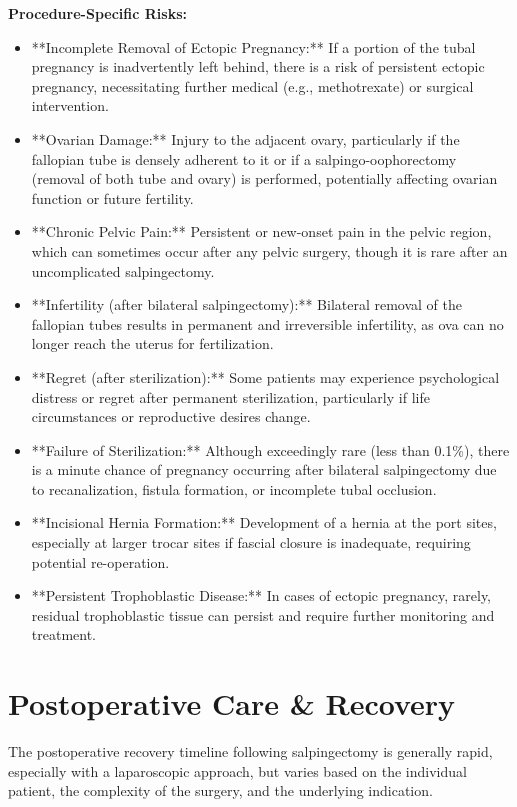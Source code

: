 \textbf{Procedure-Specific Risks:}
\begin{itemize}
  \item **Incomplete Removal of Ectopic Pregnancy:** If a portion of the tubal pregnancy is inadvertently left behind, there is a risk of persistent ectopic pregnancy, necessitating further medical (e.g., methotrexate) or surgical intervention.
  \item **Ovarian Damage:** Injury to the adjacent ovary, particularly if the fallopian tube is densely adherent to it or if a salpingo-oophorectomy (removal of both tube and ovary) is performed, potentially affecting ovarian function or future fertility.
  \item **Chronic Pelvic Pain:** Persistent or new-onset pain in the pelvic region, which can sometimes occur after any pelvic surgery, though it is rare after an uncomplicated salpingectomy.
  \item **Infertility (after bilateral salpingectomy):** Bilateral removal of the fallopian tubes results in permanent and irreversible infertility, as ova can no longer reach the uterus for fertilization.
  \item **Regret (after sterilization):** Some patients may experience psychological distress or regret after permanent sterilization, particularly if life circumstances or reproductive desires change.
  \item **Failure of Sterilization:** Although exceedingly rare (less than 0.1\%), there is a minute chance of pregnancy occurring after bilateral salpingectomy due to recanalization, fistula formation, or incomplete tubal occlusion.
  \item **Incisional Hernia Formation:** Development of a hernia at the port sites, especially at larger trocar sites if fascial closure is inadequate, requiring potential re-operation.
  \item **Persistent Trophoblastic Disease:** In cases of ectopic pregnancy, rarely, residual trophoblastic tissue can persist and require further monitoring and treatment.
\end{itemize}

\section*{Postoperative Care \& Recovery}
The postoperative recovery timeline following salpingectomy is generally rapid, especially with a laparoscopic approach, but varies based on the individual patient, the complexity of the surgery, and the underlying indication.

